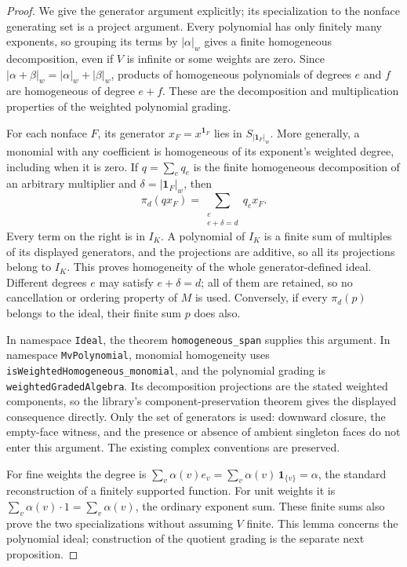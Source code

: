 \begin{proof}
\leanok
We give the generator argument explicitly; its specialization to the
nonface generating set is a project argument. Every polynomial has only
finitely many exponents, so grouping its terms by $|\alpha|_w$ gives a
finite homogeneous decomposition, even if $V$ is infinite or some weights
are zero. Since $|\alpha+\beta|_w=|\alpha|_w+|\beta|_w$, products of
homogeneous polynomials of degrees $e$ and $f$ are homogeneous of degree
$e+f$. These are the decomposition and multiplication properties of the
weighted polynomial grading.

For each nonface $F$, its generator
$x_F=x^{\mathbf1_F}$ lies in $S_{|\mathbf1_F|_w}$. More generally, a
monomial with any coefficient is homogeneous of its exponent's weighted
degree, including when it is zero. If $q=\sum_e q_e$ is the finite
homogeneous decomposition of an arbitrary multiplier and
$\delta=|\mathbf1_F|_w$, then
\[
 \pi_d(qx_F)=\sum_{\substack{e\\e+\delta=d}}q_e x_F.
\]
Every term on the right is in $I_K$. A polynomial of $I_K$ is a finite
sum of multiples of its displayed generators, and the projections are
additive, so all its projections belong to $I_K$. This proves homogeneity
of the whole generator-defined ideal. Different degrees $e$ may satisfy
$e+\delta=d$; all of them are retained, so no cancellation or ordering
property of $M$ is used. Conversely, if every $\pi_d(p)$ belongs to the
ideal, their finite sum $p$ does also.

In namespace \texttt{Ideal}, the theorem \texttt{homogeneous\_span}
supplies this argument. In namespace \texttt{MvPolynomial}, monomial
homogeneity uses \texttt{isWeightedHomogeneous\_monomial}, and the
polynomial grading is \texttt{weightedGradedAlgebra}. Its decomposition
projections are the stated weighted components, so the library's
component-preservation theorem gives the displayed consequence directly.
Only the set of generators is used: downward closure, the empty-face
witness, and the presence or absence of ambient singleton faces do not
enter this argument. The existing complex conventions are preserved.

For fine weights the degree is
$\sum_v\alpha(v)e_v=\sum_v\alpha(v)\,\mathbf1_{\{v\}}=\alpha$,
the standard reconstruction of a finitely supported function. For unit
weights it is $\sum_v\alpha(v)\cdot1=\sum_v\alpha(v)$, the ordinary
exponent sum. These finite sums also prove the two specializations without
assuming $V$ finite. This lemma concerns the polynomial ideal; construction
of the quotient grading is the separate next proposition.
\end{proof}


